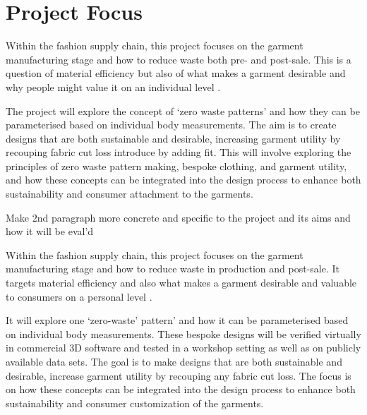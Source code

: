 \section{Project Focus}
Within the fashion supply chain, this project focuses on the garment manufacturing stage and how to reduce waste both pre- and post-sale. This is a question of material efficiency but also of what makes a garment desirable and why people might value it on an individual level . 

The project will explore the concept of `zero waste patterns' and how they can be parameterised based on individual body measurements. The aim is to create designs that are both sustainable and desirable, increasing garment utility by recouping fabric cut loss introduce by adding fit. This will involve exploring the principles of zero waste pattern making, bespoke clothing, and garment utility, and how these concepts can be integrated into the design process to enhance both sustainability and consumer attachment to the garments.

Make 2nd paragraph more concrete and specific to the project and its aims and how it will be eval'd

Within the fashion supply chain, this project focuses on the garment manufacturing stage and how to reduce waste in production and post-sale. It targets material efficiency and also what makes a garment desirable and valuable to consumers on a personal level \cite{black_sustainable_2013}. 

It will explore one `zero-waste' pattern' and how it can be parameterised based on individual body measurements. These bespoke designs will be verified virtually in commercial 3D software and tested in a workshop setting as well as on publicly available data sets. The goal is to make designs that are both sustainable and desirable, increase garment utility by recouping any fabric cut loss. The focus is on how these concepts can be integrated into the design process to enhance both sustainability and consumer customization of the garments.
